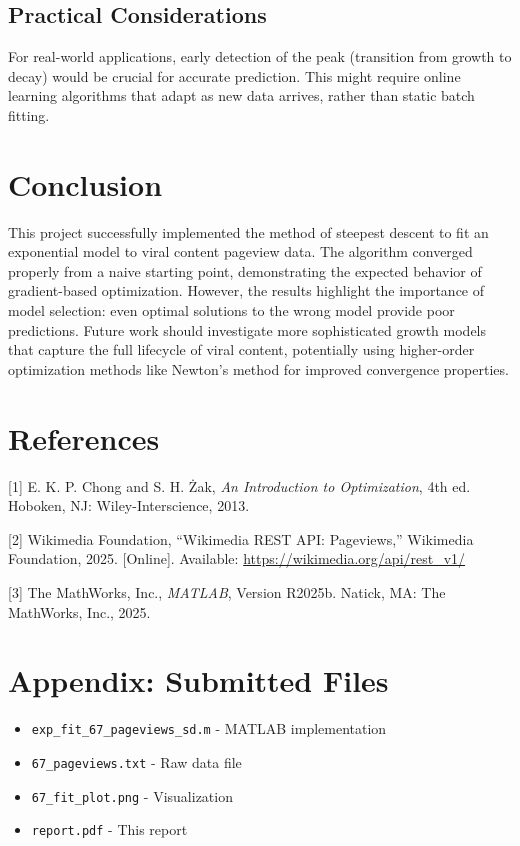 \documentclass[11pt]{article}
\begin{document}
\subsection{Practical Considerations}

For real-world applications, early detection of the peak (transition from growth to decay) would be crucial for accurate prediction. This might require online learning algorithms that adapt as new data arrives, rather than static batch fitting.

\section{Conclusion}

This project successfully implemented the method of steepest descent to fit an exponential model to viral content pageview data. The algorithm converged properly from a naive starting point, demonstrating the expected behavior of gradient-based optimization. However, the results highlight the importance of model selection: even optimal solutions to the wrong model provide poor predictions. Future work should investigate more sophisticated growth models that capture the full lifecycle of viral content, potentially using higher-order optimization methods like Newton's method for improved convergence properties.

\hrulefill

\section*{References}

[1] E. K. P. Chong and S. H. Żak, \textit{An Introduction to Optimization}, 4th ed. Hoboken, NJ: Wiley-Interscience, 2013.

[2] Wikimedia Foundation, ``Wikimedia REST API: Pageviews,'' Wikimedia Foundation, 2025. [Online]. Available: \url{https://wikimedia.org/api/rest_v1/}

[3] The MathWorks, Inc., \textit{MATLAB}, Version R2025b. Natick, MA: The MathWorks, Inc., 2025.

\hrulefill


\section*{Appendix: Submitted Files}
\begin{itemize}
    \item \texttt{exp\_fit\_67\_pageviews\_sd.m} - MATLAB implementation
    \item \texttt{67\_pageviews.txt} - Raw data file
    \item \texttt{67\_fit\_plot.png} - Visualization
    \item \texttt{report.pdf} - This report
\end{itemize}
\end{document}
